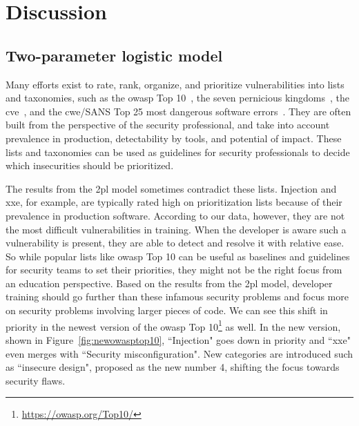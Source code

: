 \section{Discussion}
\label{sec:its-discussion}

\subsection{Two-parameter logistic model}
Many efforts exist to rate, rank, organize, and prioritize vulnerabilities into lists and taxonomies, such as the \gls{owasp} Top 10~\cite{wichers2017owasp}, the seven pernicious kingdoms~\cite{tsipenyuk2005seven}, the \gls{cve}~\cite{guo2009ontology,mann1999towards,baker1999development}, and the \gls{cwe}/SANS Top 25 most dangerous software errors~\cite{martin20112011}.
They are often built from the perspective of the security professional, and take into account prevalence in production, detectability by tools, and potential of impact.
These lists and taxonomies can be used as guidelines for security professionals to decide which insecurities should be prioritized.

The results from the \gls{2pl} model sometimes contradict these lists.
Injection and \gls{xxe}, for example, are typically rated high on prioritization lists because of their prevalence in production software.
According to our data, however, they are not the most difficult vulnerabilities in training.
When the developer is aware such a vulnerability is present, they are able to detect and resolve it with relative ease.
So while popular lists like \gls{owasp} Top 10 can be useful as baselines and guidelines for security teams to set their priorities, they might not be the right focus from an education perspective.
Based on the results from the \gls{2pl} model, developer training should go further than these infamous security problems and focus more on security problems involving larger pieces of code.
We can see this shift in priority in the newest version of the \gls{owasp} Top 10\footnote{\url{https://owasp.org/Top10/}} as well.
In the new version, shown in Figure~\ref{fig:newowasptop10}, ``Injection" goes down in priority and ``\gls{xxe}" even merges with ``Security misconfiguration".
New categories are introduced such as ``insecure design", proposed as the new number 4, shifting the focus towards security flaws.

